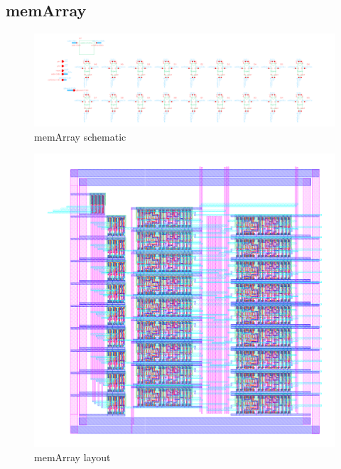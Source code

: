 \documentclass[]{article}
\begin{document}
\subsection{memArray}
\begin{figure}[H]
\centering
\includegraphics[width=.9\textwidth]{memArray-schematic}
\caption{memArray schematic}
\label{fig:memArray-schematic}
\end{figure}

\begin{figure}[H]
\centering
\includegraphics[width=.9\textwidth]{memArray-layout}
\caption{memArray layout}
\label{fig:memArray-layout}
\end{figure}
\end{document}
